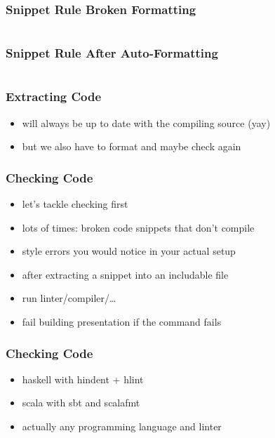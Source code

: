 \documentclass{beamer}
\begin{document}
\begin{frame}
  \frametitle{Snippet Rule \textemdash{} Broken Formatting}
  \begin{center}
    \inputminted[autogobble]{haskell}{snippets/outer-haskell-snippet-rule.hs_noformat}
  \end{center}
\end{frame}

\begin{frame}
  \frametitle{Snippet Rule \textemdash{} After Auto-Formatting}
  \begin{center}
    \inputminted[autogobble]{haskell}{snippets/haskell-snippet-rule.hs}
  \end{center}
\end{frame}

\begin{frame}
  \frametitle{Extracting Code}
  \begin{itemize}
  \item will always be up to date with the compiling source (yay)
  \item but we also have to format and maybe check again
  \end{itemize}
\end{frame}

\begin{frame}
  \frametitle{Checking Code}
  \begin{itemize}
  \item let's tackle checking first
  \item lots of times: broken code snippets that don't compile
  \item style errors you would notice in your actual setup
  \item after extracting a snippet into an includable file
  \item run linter/compiler/\ldots
  \item fail building presentation if the command fails
  \end{itemize}
\end{frame}

\begin{frame}
  \frametitle{Checking Code}
  \begin{itemize}
  \item haskell with hindent + hlint
  \item scala with sbt and scalafmt
  \item actually any programming language and linter
  \end{itemize}
\end{frame}
\end{document}

